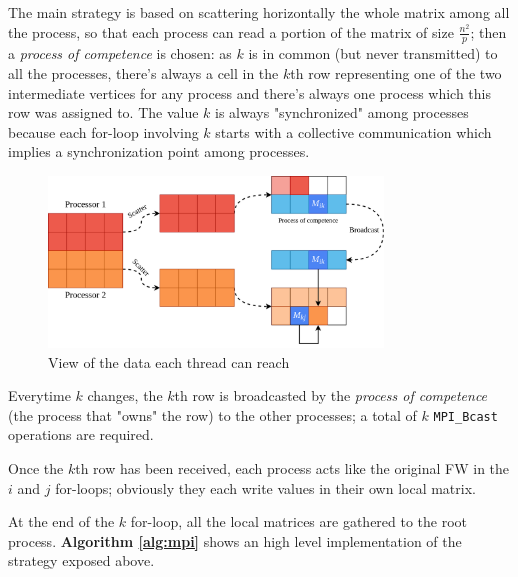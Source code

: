 The main strategy is based on scattering horizontally the whole matrix among all the process, so that
each process can read a portion of the matrix of size $\frac{n^2}{p}$; then a \emph{process of competence}
is chosen: as $k$ is in common (but never transmitted) to all the processes, there's always a cell in the $k$th
row representing one of the two intermediate vertices for any process and there's always one process which this row was assigned to.
The value $k$ is always "synchronized" among processes because each for-loop involving $k$ starts with a collective communication
which implies a synchronization point among processes.

\begin{figure}[h!]
\centering                                                                        
\includegraphics[width=3.5in]{diagrams/mpi-scatter}
\captionsetup{justification=centering}                                                                                                                                   
\caption{View of the data each thread can reach}                                                                                                                                            
\label{fig:threads}                                                                                                                                                           
\end{figure}
Everytime $k$ changes, the $k$th row is broadcasted by the \emph{process of competence} (the process that "owns" the row) to the other processes;
a total of $k$ \texttt{MPI\_Bcast} operations are required. \par
Once the $k$th row has been received, each process acts like the original FW in the $i$ and $j$ for-loops; obviously
they each write values in their own local matrix. \par

At the end of the $k$ for-loop, all the local matrices are gathered to the root process. 
\textbf{Algorithm \ref*{alg:mpi}} shows an high level implementation of the strategy exposed above.\par

